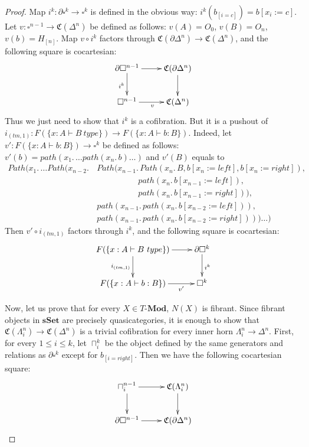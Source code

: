 \documentclass[reqno]{amsart}
\theoremstyle{definition}
\theoremstyle{remark}
\newcommand{\repl}{:=}
\newcommand{\cat}[1]{\mathbf{#1}}
\newcommand{\Mod}[1]{#1\text{-}\cat{Mod}}
\newcommand{\sSet}{\cat{sSet}}
\newcommand{\M}{H}
\numberwithin{figure}{section}
\begin{document}
\begin{proof}
Map $i^k : \partial \square^k \to \square^k$ is defined in the obvious way: $i^k(b_{[i=c]}) = b[x_i \repl c]$.
Let $v : \square^{n-1} \to \mathfrak{C}(\Delta^n)$ be defined as follows: $v(A) = O_0$, $v(B) = O_n$, $v(b) = \M_{[n]}$.
Map $v \circ i^k$ factors through $\mathfrak{C}(\partial \Delta^n) \to \mathfrak{C}(\Delta^n)$, and the following square is cocartesian:
\[ \xymatrix{ \partial \square^{n-1} \ar[r] \ar[d]_{i^k} & \mathfrak{C}(\partial \Delta^n) \ar[d] \\
              \square^{n-1} \ar[r]_v & \mathfrak{C}(\Delta^n)
            } \]
Thus we just need to show that $i^k$ is a cofibration.
But it is a pushout of $i_{(tm,1)} : F(\{ x : A \vdash B\ type \}) \to F(\{ x : A \vdash b : B \})$.
Indeed, let $v' : F(\{ x : A \vdash b : B \}) \to \square^k$ be defined as follows: $v'(b) = path(x_1.\,\ldots path(x_n.\,b) \ldots)$ and $v'(B)$ equals to
\begin{align*}
Path(x_1.\, \ldots Path(x_{n-2}.\, & Path(x_{n-1}.\,     Path(x_n.\,B, b[x_n \repl left], b[x_n \repl right]), \\
                                   & \qquad \qquad \quad path(x_n.\,b[x_{n-1} \repl left]), \\
                                   & \qquad \qquad \quad path(x_n.\,b[x_{n-1} \repl right])), \\
                                   & path(x_{n-1}.\,     path(x_n.\,b[x_{n-2} \repl left])), \\
                                   & path(x_{n-1}.\,     path(x_n.\,b[x_{n-2} \repl right]))) \ldots )
\end{align*}
Then $v' \circ i_{(tm,1)}$ factors through $i^k$, and the following square is cocartesian:
\[ \xymatrix{ F(\{ x : A \vdash B\ type \}) \ar[r] \ar[d]_{i_{(tm,1)}} & \partial \square^k \ar[d]^{i^k} \\
              F(\{ x : A \vdash b : B \}) \ar[r]_-{v'} & \square^k
            } \]

Now, let us prove that for every $X \in \Mod{T}$, $N(X)$ is fibrant.
Since fibrant objects in $\sSet$ are precisely quasicategories,
it is enough to show that $\mathfrak{C}(\Lambda^n_i) \to \mathfrak{C}(\Delta^n)$ is a trivial cofibration for every inner horn $\Lambda^n_i \to \Delta^n$.
First, for every $1 \leq i \leq k$, let $\sqcap^k_i$ be the object defined by the same generators and relations as $\partial \square^k$ except for $b_{[i=right]}$.
Then we have the following cocartesian square:
\[ \xymatrix{ \sqcap^{n-1}_i \ar[r] \ar[d] & \mathfrak{C}(\Lambda^n_i) \ar[d] \\
              \partial \square^{n-1} \ar[r] & \mathfrak{C}(\partial \Delta^n)
            } \]


\end{proof}
\end{document}
